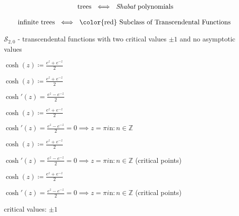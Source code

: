 \documentclass{beamer}
\begin{document}
\begin{frame}

\begin{align*} \text{trees }  \iff \text{ {\it Shabat} polynomials } \end{align*}

\vspace{5mm}

\begin{align*} \text{infinite trees }  \iff \text{ {\color{red} Subclass of Transcendental Functions } } \end{align*}

{\color{red} $\mathcal{S}_{2,0}$ } - transcendental functions with two critical values $\pm 1$ and no asymptotic values

\end{frame}




\begin{frame} 

$\cosh(z) \coloneqq \frac{e^z+e^{-z}}{2}$

\end{frame}


\begin{frame} 

$\cosh(z) \coloneqq \frac{e^z+e^{-z}}{2}$

$\cosh'(z) = \frac{e^z-e^{-z}}{2}$

\end{frame}


\begin{frame} 

$\cosh(z) \coloneqq \frac{e^z+e^{-z}}{2}$

$\cosh'(z) = \frac{e^z-e^{-z}}{2} = 0 \implies z = \pi i \text{n} : n \in \mathbb{Z}$

\end{frame}


\begin{frame} 

$\cosh(z) \coloneqq \frac{e^z+e^{-z}}{2}$

$\cosh'(z) = \frac{e^z-e^{-z}}{2} = 0 \implies z = \pi i \text{n} : n \in \mathbb{Z}$ (critical points)

\end{frame}




\begin{frame} 

$\cosh(z) \coloneqq \frac{e^z+e^{-z}}{2}$

$\cosh'(z) = \frac{e^z-e^{-z}}{2} = 0 \implies z = \pi i \text{n} : n \in \mathbb{Z}$ (critical points)

\vspace{5mm}

critical values: $\pm 1$ 

\end{frame}
\end{document}
